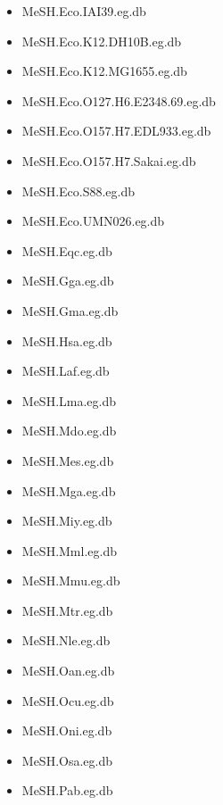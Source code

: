 \documentclass[margin,line,10pt]{res}
\newenvironment{list1}{
  \begin{list}{\ding{113}}{%
      \setlength{\itemsep}{0in}
      \setlength{\parsep}{0in} \setlength{\parskip}{0in}
      \setlength{\topsep}{0in} \setlength{\partopsep}{0in} 
      \setlength{\leftmargin}{0.17in}}}{\end{list}}
\begin{document}
\begin{resume}
\begin{list1}
\begin{multicols}{2}
\begin{itemize}
\item MeSH.Eco.IAI39.eg.db 
\item MeSH.Eco.K12.DH10B.eg.db
\item MeSH.Eco.K12.MG1655.eg.db
\item MeSH.Eco.O127.H6.E2348.69.eg.db
\item MeSH.Eco.O157.H7.EDL933.eg.db 
\item MeSH.Eco.O157.H7.Sakai.eg.db
\item MeSH.Eco.S88.eg.db
\item MeSH.Eco.UMN026.eg.db
\item MeSH.Eqc.eg.db 
\item MeSH.Gga.eg.db
\item MeSH.Gma.eg.db 
\item MeSH.Hsa.eg.db
\item MeSH.Laf.eg.db 
\item MeSH.Lma.eg.db 
\item MeSH.Mdo.eg.db 
\item MeSH.Mes.eg.db 
\item MeSH.Mga.eg.db 
\item MeSH.Miy.eg.db 
\item MeSH.Mml.eg.db 
\item MeSH.Mmu.eg.db 
\item MeSH.Mtr.eg.db 
\item MeSH.Nle.eg.db 
\item MeSH.Oan.eg.db 
\item MeSH.Ocu.eg.db 
\item MeSH.Oni.eg.db 
\item MeSH.Osa.eg.db 
\item MeSH.Pab.eg.db 

\end{itemize}
\end{multicols}
\end{list1}
\end{resume}
\end{document}
